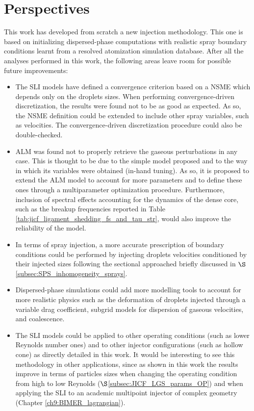 \section*{Perspectives}

This work has developed from scratch a new injection methodology. This one is based on initializing dispersed-phase computations with realistic spray boundary conditions learnt from a resolved atomization simulation database. After all the analyses performed in this work, the following areas leave room for possible future improvements:

\begin{itemize}

	\item The SLI models have defined a convergence criterion based on a NSME which depends only on the droplets sizes. When performing convergence-driven discretization, the results were found not to be as good as expected. As so, the NSME definition could be extended to include other spray variables, such as velocities. The convergence-driven discretization procedure could also be double-checked.
	
	\item ALM was found not to properly retrieve the gaseous perturbations in any case. This is thought to be due to the simple model proposed and to the way in which its variables were obtained (in-hand tuning). As so, it is proposed to extend the ALM model to account for more parameters and to define these ones through a multiparameter optimization procedure. Furthermore, inclusion of spectral effects accounting for the dynamics of the dense core, such as the breakup frequencies reported in Table \ref{tab:jicf_ligament_shedding_fs_and_tau_str}, would also improve the reliability of the model.
	
	\item In terms of spray injection, a more accurate prescription of boundary conditions could be performed by injecting droplets velocities conditioned by their injected sizes following the sectional approached briefly discussed in $\S$\ref{subsec:SPS_inhomogeneity_sprays}.
	
	\item Dispersed-phase simulations could add more modelling tools to account for more realistic physics such as the deformation of droplets injected through a variable drag coefficient, subgrid models for dispersion of gaseous velocities, and coalescence.
	
	\item The SLI models could be applied to other operating conditions (such as lower Reynolds number ones) and to other injector configurations (such as hollow cone) as directly detailed in this work. It would be interesting to see this methodology in other applications, since as shown in this work the results improve in terms of particles sizes when changing the operating condition from high to low Reynolds ($\S$\ref{subsec:JICF_LGS_params_OP}) and when applying the SLI to an academic multipoint injector of complex geometry (Chapter \ref{ch9:BIMER_lagrangian}).


\end{itemize} 

